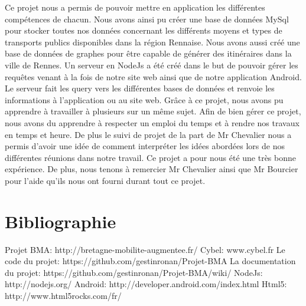 \documentclass[twocolumn]{article}   		%
\begin{document}
	Ce projet nous a permis de pouvoir mettre en application les diff\'erentes comp\'etences de chacun. Nous avons ainsi pu cr\'eer une base de donn\'ees MySql pour stocker toutes nos donn\'ees concernant les diff\'erents moyens et types de transports publics disponibles dans la r\'egion Rennaise. Nous avons aussi cr\'e\'e une base de donn\'ees de graphes pour \^etre   capable de g\'en\'erer des itin\'eraires dans la ville de Rennes. Un serveur en NodeJs a \'et\'e cr\'e\'e dans le but de pouvoir g\'erer les requ\^etes venant \`a la fois de notre site web ainsi que de notre application Android. Le serveur fait les query vers les diff\'erentes bases de donn\'ees et renvoie les informations \`a l'application ou au site web. Gr\^ace \`a ce projet, nous avons pu apprendre \`a travailler \`a plusieurs sur un m\^eme sujet. Afin de bien g\'erer ce projet, nous avons du apprendre \`a respecter un emploi du temps et \`a rendre nos travaux en temps et heure. De plus le suivi de projet de la part de Mr Chevalier nous a permis d'avoir une id\'ee de comment interpr\'eter les id\'ees abord\'ees lors de nos diff\'erentes r\'eunions dans notre travail. Ce projet a pour nous \'et\'e une tr\`es bonne exp\'erience. De plus, nous tenons \`a remercier Mr Chevalier ainsi que Mr Bourcier pour l'aide qu'ils nous ont fourni durant tout ce projet.
\section{Bibliographie}

\begin{flushleft}
Projet BMA: http://bretagne-mobilite-augmentee.fr/
\newline 
Cybel: www.cybel.fr
\newline 
Le code du projet: https://github.com/gestinronan/Projet-BMA
\newline 
La documentation du projet: https://github.com/gestinronan/Projet-BMA/wiki/
\newline 
NodeJs: http://nodejs.org/
\newline 
Android: http://developer.android.com/index.html
\newline 
Html5: http://www.html5rocks.com/fr/
\end{flushleft}



	
\end{document}
